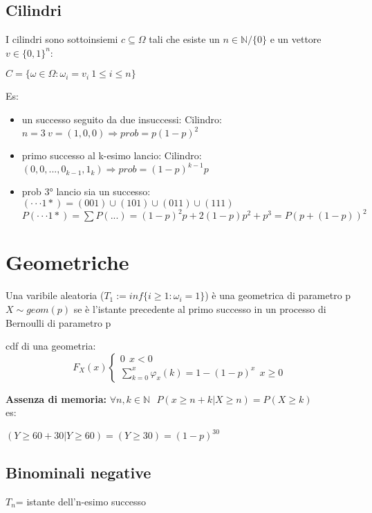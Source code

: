 \documentclass[11pt, letterpaper]{article}
\begin{document}
\subsection{Cilindri}
I cilindri sono sottoinsiemi $c\subseteq\Omega$ tali che esiste un $n\in\mathbb{N}/\{0\}$ e un vettore $v\in\{0,1\}^{n}$:
\begin{center}
    $C=\{\omega\in\Omega :\omega_{i}=v_{i}\ 1\leq i\leq n\}$
\end{center}
Es:
\begin{itemize}
    \item un successo seguito da due insuccessi:
    \subitem Cilindro: $n=3\ v=(1,0,0)\Rightarrow prob=p(1-p)^{2}$
    \item primo successo al k-esimo lancio:
    \subitem Cilindro: $(0,0,...,0_{k-1},1_{k})\Rightarrow prob=(1-p)^{k-1}p$
    \item prob 3° lancio sia un successo:
    \subitem $(\cdot\cdot\cdot 1*)=(001)\cup(101)\cup(011)\cup(111)$
    \subitem $P(\cdot\cdot\cdot 1*)=\sum P(...)=(1-p)^{2}p+2(1-p)p^{2}+p^{3}=P(p+(1-p))^{2}$ 
\end{itemize}

\section{Geometriche}
Una varibile aleatoria ($T_{1}:=inf\{i\geq 1: \omega_{i}=1\}$) è una geometrica di parametro p $X\sim geom(p)$
se è l'istante precedente al primo successo in un processo di Bernoulli di parametro p

cdf di una geometria:
\begin{equation}
    F_{X}(x)
  \begin{cases}
    0\ \ x<0\\
    \sum_{k=0}^{x} \varphi_{x}(k)=1-(1-p)^{x}\ \ x \geq 0
  \end{cases}
\end{equation}

\textbf{Assenza di memoria:} $\forall n,k\in\mathbb{N}\ \ \ P(x\geq n+k|X\geq n)=P(X\geq k)$\\
es:
\begin{center}
    $(Y\geq 60+30|Y\geq 60)=(Y\geq 30)=(1-p)^{30}$
\end{center}

\subsection{Binominali negative}
$T_{n}$= istante dell'n-esimo successo
\end{document}
